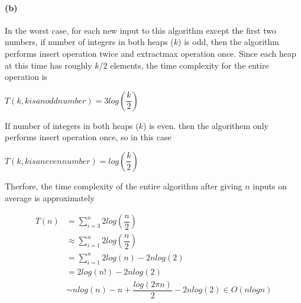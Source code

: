 \documentclass[11pt]{csc_assignment}
\begin{document}
\begin{description}
\paragraph{(b)}
In the worst case, for each new input to this algorithm except the first two numbers, if number of integers in both heaps ($ k $) is odd, then the algorithm performs insert operation twice and extractmax operation once. Since each heap at this time has roughly $ k/2 $ elements, the time complexity for the entire operation is 
\begin{center}
	$ T(k, k is an odd number) = 3log(\dfrac{k}{2})$
\end{center} 
If number of integers in both heaps  ($ k $) is even. then the algorithem only performs insert operation once, so in this case
\begin{center}
	$ T(k, k is an even number) = log(\dfrac{k}{2})$
\end{center} 
Therfore, the time complexity of the entire algorithm after giving $ n $ inputs on average is approximately


\begin{align*}
	 T(n) &= \sum_{i=3}^{n}2log(\dfrac{n}{2}) \\
	         &\approx \sum_{i=1}^{n}2log(\dfrac{n}{2})\\
	        &=\sum_{i=1}^{n}2log(n)-2nlog(2)\\
	&=2log(n!)-2nlog(2)\\
	&\sim nlog(n)-n+\dfrac{log(2\pi n)}{2} -2nlog(2) \in O(nlogn)            
\end{align*}





\end{description}
\end{document}
